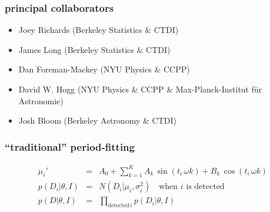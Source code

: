 \documentclass[pdftex]{beamer}
\begin{document}
\begin{frame}
\end{frame}

\begin{frame}
  \frametitle{principal collaborators}
  \begin{itemize}
  \item Joey Richards (Berkeley Statistics \& CTDI)
  \item James Long (Berkeley Statistics \& CTDI)
  \item Dan Foreman-Mackey (NYU Physics \& CCPP)
  \item David W. Hogg (NYU Physics \& CCPP \& Max-Planck-Institut f\"ur Astronomie)
  \item Josh Bloom (Berkeley Astronomy \& CTDI)
  \end{itemize}
\end{frame}

\begin{frame}
  \frametitle{``traditional'' period-fitting}
\begin{eqnarray}\displaystyle
\mu_i' &=& A_0 + \sum_{k=1}^K A_k\, \sin (t_i \, \omega  k) + B_k\, \cos (t_i \, \omega  k)
\nonumber \\
p(D_i|\theta,I) &=& N(D_i|\mu_i,\sigma^2_i) \quad \mbox{when $i$ is detected}
\nonumber \\
p(D|\theta,I) &=& \prod_{\mbox{detected}\,i} p(D_i|\theta,I)
\nonumber
\end{eqnarray}
\end{frame}
\end{document}
